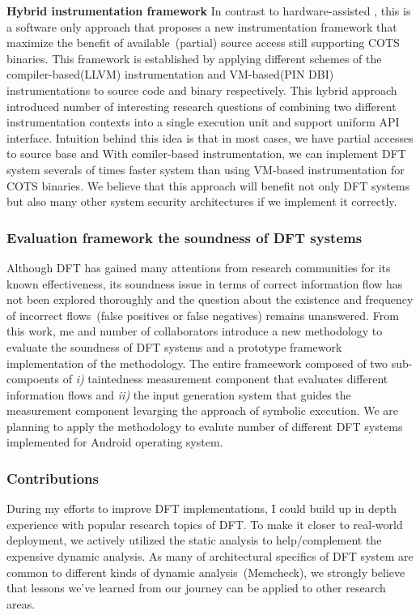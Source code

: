 \documentclass[letterpaper, 10pt]{article}
\begin{document}
\begin{small}
{\bf Hybrid instrumentation framework} In contrast to hardware-assisted \SR,
this is a software only approach that proposes a new instrumentation framework
that maximize the benefit of available~(partial) source access still supporting
COTS binaries.
%
This framework is established by applying different schemes of the
compiler-based(LLVM) instrumentation and VM-based(PIN DBI) instrumentations to
source code and binary respectively.
%
This hybrid approach introduced number of interesting research questions of
combining two different instrumentation contexts into a single execution unit
and support uniform API interface.
%
Intuition behind this idea is that in most cases, we have partial accesses to
source base and With comiler-based instrumentation, we can implement DFT system
severals of times faster system than using VM-based instrumentation for COTS
binaries.
%
We believe that this approach will benefit not only DFT systems but also many
other system security architectures if we implement it correctly.

\subsubsection*{Evaluation framework the soundness of DFT systems}
%
Although DFT has gained many attentions from research communities for its known
effectiveness, its soundness issue in terms of correct information flow has not
been explored thoroughly and the question about the existence and frequency of
incorrect flows~(false positives or false negatives) remains unanswered. From
this work, me and number of collaborators introduce a new methodology to
evaluate the soundness of DFT systems and a prototype framework implementation
of the methodology.
%
The entire frameework composed of two sub-compoents of {\it i)} taintedness
measurement component that evaluates different information flows and {\it ii)}
the input generation system that guides the measurement component levarging the
approach of symbolic execution. 
%
We are planning to apply the methodology to evalute number of different DFT
systems implemented for Android operating system.

\subsubsection*{Contributions}
During my efforts to improve DFT implementations, I could build up in depth
experience with popular research topics of DFT.
%
To make it closer to real-world deployment, we actively utilized the static
analysis to help/complement the expensive dynamic analysis.
%
As many of architectural specifics of DFT system are common to different kinds
of dynamic analysis~(\ie Memcheck), we strongly believe that lessons we've
learned from our journey can be applied to other research areas.


\end{small}
\end{document}
